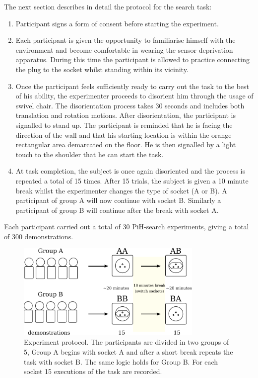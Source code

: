 \documentclass[final,3p,times,twocolumn]{elsarticle}
\begin{document}
The next section describes in detail the protocol for the search task:

\begin{enumerate}
 \item Participant signs a form of consent before starting the experiment.
 \item Each participant is given the opportunity to familiarise himself with the environment and become 
 comfortable in wearing the sensor deprivation apparatus.
 During this time the participant is allowed to practice connecting the plug to the socket whilst standing within its vicinity.  
 \item Once the participant feels sufficiently ready to carry out the task to the best of his ability, the experimenter 
  proceeds to disorient him through the usage of swivel chair. The disorientation process takes 30 seconds and includes
  both translation and rotation motions. After disorientation, the participant is signalled to stand up. The participant
  is reminded that he is facing the direction of the wall and that his starting location is within the orange 
  rectangular area demarcated on the floor. He is then signalled by a light touch to the shoulder 
  that he can start the task.
  \item At task completion, the subject is once again disoriented and the process is repeated a total of 15 times.
  After 15 trials, the subject is given a 10 minute break whilst the experimenter changes the type of socket (A or B). 
  A participant of group A will now continue with socket B. Similarly a participant of group B will continue after the break 
  with socket A.
\end{enumerate}

Each participant carried out a total of 30 PiH-search experiments, giving a total of 300 demonstrations.

\begin{figure}
\centering
 \includegraphics[width=0.8\textwidth]{./Figures/Fig/experiment_design_v2.pdf}
 \caption{Experiment protocol. The participants are divided in two groups of 5, Group A begins with socket A 
 and after a short break repeats the task with socket B. The same logic holds for Group B.
 For each socket 15 executions of the task are recorded.}
 \label{fig:experiment_design}
\end{figure}
\end{document}
